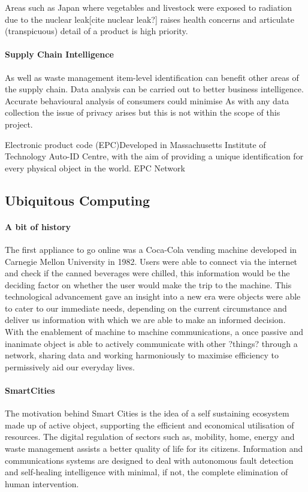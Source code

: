 \documentclass[a4paper, 11pt]{article}
\begin{document}
Areas such as Japan where vegetables and livestock were exposed to radiation due to the nuclear leak[cite nuclear leak?] raises health concerns and articulate (transpicuous) detail of a product is high priority.


\paragraph{Supply Chain Intelligence} As well as waste management item-level identification can benefit other areas of the supply chain. Data analysis can be carried out to better business intelligence. Accurate behavioural analysis of consumers could minimise 
As with any data collection the issue of privacy arises but this is not within the scope of this project. 

Electronic product code (EPC)Developed in Massachusetts Institute of Technology Auto-ID Centre, with the aim of providing a unique identification for every physical object in the world. EPC Network


\vspace{\baselineskip}
\vspace{\baselineskip}
\vspace{\baselineskip}


\subsection{Ubiquitous Computing}
\paragraph{A bit of history} The first appliance to go online was a Coca-Cola vending machine developed in Carnegie Mellon University in 1982. Users were able to connect via the internet and check if the canned beverages were chilled, this information would be the deciding factor on whether the user would make the trip to the machine. This technological advancement gave an insight into a new era were objects were able to cater to our immediate needs, depending on the current circumstance and deliver us information with which we are able to make an informed decision. With the enablement of machine to machine communications, a once passive and inanimate object is able to actively communicate with other ?things? through a network, sharing data and working harmoniously to maximise efficiency to permissively aid our everyday lives.

\paragraph{SmartCities} The motivation behind Smart Cities is the idea of a self sustaining ecosystem made up of active object, supporting the efficient and economical utilisation of resources. The digital regulation of sectors such as, mobility, home, energy and waste management assists a better quality of life for its citizens. Information and communications systems are designed to deal with autonomous fault detection and self-healing intelligence with minimal, if not, the complete elimination of human intervention. 
\end{document}
